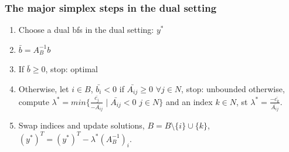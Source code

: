 \documentclass[main]{subfiles}
\begin{document}
\subsubsection{The major simplex steps in the dual setting}
\begin{enumerate}
\item Choose a dual bfs in the dual setting: $y^*$
\item $\bar{b} = A^{-1}_B b$
\item If $\bar{b} \geq 0$, stop: optimal
\item Otherwise, let $i \in B$, $\bar{b_i} < 0$
\subitem if $\bar{A_{ij}} \geq 0$ $\forall j \in N$, stop: unbounded
\subitem otherwise, compute $\lambda^* = min \{\frac{\bar{c_j}}{-\bar{A_{ij}}}
\mid \bar{A_{ij}} < 0$ $j \in N \}$ and an index $k \in N$, st $\lambda^* =
\frac{-\bar{c_k}}{\bar{A_{ij}}}$.
\item Swap indices and update solutions, $B = B\setminus \{i\} \cup \{k\}$, 
$(y^*)^T = (y^*)^T - \lambda^* (A^{-1}_B)_i$.
\end{enumerate}
\end{document}
